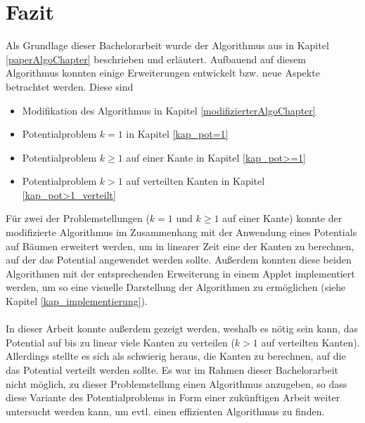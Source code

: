 \section{Fazit}

Als Grundlage dieser Bachelorarbeit wurde der Algorithmus aus \cite{cima_paper} in Kapitel \ref{paperAlgoChapter} beschrieben und erläutert. Aufbauend auf diesem Algorithmus konnten einige Erweiterungen entwickelt bzw. neue Aspekte betrachtet werden. Diese sind
\begin{itemize}
	\item Modifikation des Algorithmus in Kapitel \ref{modifizierterAlgoChapter}
	\item Potentialproblem $k = 1$ in Kapitel \ref{kap_pot=1}
	\item Potentialproblem $k \geq 1$ auf einer Kante in Kapitel \ref{kap_pot>=1}
	\item Potentialproblem $k > 1$ auf verteilten Kanten in Kapitel \ref{kap_pot>1_verteilt}
\end{itemize}

Für zwei der Problemstellungen ($k = 1$ und $k \geq 1$ auf einer Kante)  konnte der modifizierte Algorithmus im Zusammenhang mit der Anwendung eines Potentials auf Bäumen erweitert werden, um in linearer Zeit eine der Kanten zu berechnen, auf der das Potential angewendet werden sollte. Außerdem konnten diese beiden Algorithmen mit der entsprechenden Erweiterung in einem Applet implementiert werden, um so eine visuelle Darstellung der Algorithmen zu ermöglichen (siehe Kapitel \ref{kap_implementierung}). 
\\
\\
In dieser Arbeit konnte außerdem gezeigt werden, weshalb es nötig sein kann, das Potential auf bis zu linear viele Kanten zu verteilen ($k > 1$ auf verteilten Kanten). Allerdings stellte es sich als schwierig heraus, die Kanten zu berechnen, auf die das Potential verteilt werden sollte. Es war im Rahmen dieser Bachelorarbeit nicht möglich, zu dieser Problemstellung einen Algorithmus anzugeben, so dass diese Variante des Potentialproblems in Form einer zukünftigen Arbeit weiter untersucht werden kann, um evtl. einen effizienten Algorithmus zu finden.
